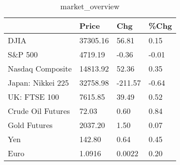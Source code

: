 \documentclass{article}%
\begin{document}
%


\begin{table}[htbp]%
\caption{market\_overview}%
\centering%
\begin{adjustbox}{width=1\textwidth}%
\begin{tabular}{llll}
\toprule
                  &    Price &     Chg &  \%Chg \\
\midrule
             DJIA & 37305.16 &   56.81 &  0.15 \\
          S\&P 500 &  4719.19 &   -0.36 & -0.01 \\
 Nasdaq Composite & 14813.92 &   52.36 &  0.35 \\
Japan: Nikkei 225 & 32758.98 & -211.57 & -0.64 \\
     UK: FTSE 100 &  7615.85 &   39.49 &  0.52 \\
Crude Oil Futures &    72.03 &    0.60 &  0.84 \\
     Gold Futures &  2037.20 &    1.50 &  0.07 \\
              Yen &   142.80 &    0.64 &  0.45 \\
             Euro &   1.0916 &  0.0022 &  0.20 \\
\bottomrule
\end{tabular}
%
\end{adjustbox}%
\end{table}

%
\end{document}

